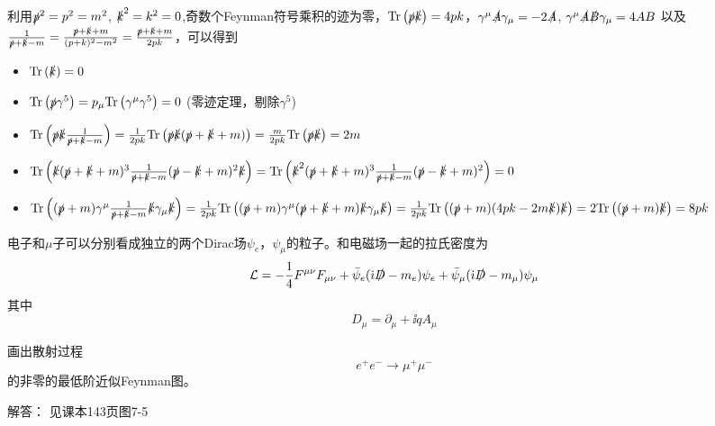 \documentclass[CJK]{beamer}
\begin{document}
\begin{frame}
\bch
{\tiny
利用$\slashed{p}^2 = p^2 = m^2$, $\slashed{k}^2 = k^2 = 0$,奇数个Feynman符号乘积的迹为零，$\mathrm{Tr}\left(\slashed{p}\slashed{k}\right) = 4pk$，$\gamma^\mu\slashed{A}\gamma_\mu = -2\slashed{A}$, $\gamma^\mu\slashed{A}\slashed{B}\gamma_\mu = 4 AB$ 以及$\frac{1}{\slashed{p}+\slashed{k}-m} = \frac{\slashed{p}+\slashed{k}+m}{(p+k)^2-m^2} = \frac{\slashed{p}+\slashed{k}+m}{2pk}$，可以得到
\begin{itemize}
\item{$\mathrm{Tr}\left(\slashed{k}\right) = 0$  }
\item{$\mathrm{Tr}\left(\slashed{p}\gamma^5\right) = p_\mu\mathrm{Tr}\left(\gamma^\mu\gamma^5\right) = 0$ (零迹定理，剔除$\gamma^5$) }
\item{$\mathrm{Tr}\left(\slashed{p}\slashed{k} \frac{1}{\slashed{p}+\slashed{k}-m}\right) = \frac{1}{2pk}\mathrm{Tr}\left(\slashed{p}\slashed{k}(\slashed{p}+\slashed{k}+m)\right) = \frac{m}{2pk}\mathrm{Tr}\left(\slashed{p}\slashed{k}\right) = 2m$}
\item{$\mathrm{Tr}\left(\slashed{k}(\slashed{p}+\slashed{k}+m)^3\frac{1}{\slashed{p}+\slashed{k}-m}(\slashed{p}-\slashed{k}+m)^2\slashed{k}\right) = \mathrm{Tr}\left(\slashed{k}^2(\slashed{p}+\slashed{k}+m)^3\frac{1}{\slashed{p}+\slashed{k}-m}(\slashed{p}-\slashed{k}+m)^2\right) = 0$}
\item{$\mathrm{Tr}\left((\slashed{p}+m)\gamma^\mu\frac{1}{\slashed{p}+\slashed{k} -m}\slashed{k}\gamma_\mu\slashed{k}\right) = \frac{1}{2pk} \mathrm{Tr}\left((\slashed{p}+m)\gamma^\mu(\slashed{p}+\slashed{k} + m)\slashed{k}\gamma_\mu\slashed{k}\right) =  \frac{1}{2pk} \mathrm{Tr}\left((\slashed{p}+m) (4pk - 2m\slashed{k}) \slashed{k}\right) = 2 \mathrm{Tr}\left((\slashed{p}+m)\slashed{k} \right)  = 8 pk$ }
\end{itemize}
}
\ech
\end{frame}

\begin{frame}
\bch
{\scriptsize
电子和$\mu$子可以分别看成独立的两个Dirac场$\psi_e$，$\psi_\mu$的粒子。和电磁场一起的拉氏密度为
$${\mathcal{L}} = -\frac{1}{4}{F^{\mu\nu}}{F_{\mu\nu}} + \bar{\psi}_e({\dot{\imath}} \slashed{D} - m_e)\psi_e + \bar{\psi}_\mu({\dot{\imath}} \slashed{D} - m_\mu)\psi_\mu$$
其中
$$ D_\mu = \partial_\mu + \ii q A_\mu$$

画出散射过程
$$e^+e^- \rightarrow \mu^+\mu^-$$
的非零的最低阶近似Feynman图。

\skipline

解答： 见课本143页图7-5
}


\ech
\end{frame}
\end{document}
